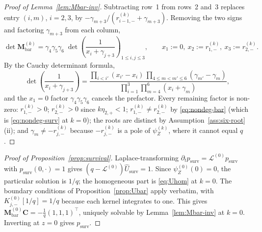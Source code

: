 \documentclass[11pt]{article}
\theoremstyle{plain}
\theoremstyle{definition}
\theoremstyle{remark}
\begin{document}
\begin{proof}[Proof of Lemma~\ref{lem:Mbar-inv}]\label{proof:lem:Mbar-inv}
Subtracting row~1 from rows~2 and~3 replaces entry $(i,m)$, $i=2,3$, by
$-\gamma_{m+3}/(r_{i-1,-}^{(k)}+\gamma_{m+3})$. Removing the two signs and factoring
$\gamma_{m+3}$ from each column,
\[
\det\mathbf{M}_{\mathrm{bar}}^{(k)}
=
\gamma_4\gamma_5\gamma_6\;
\det\!\left(\frac{1}{x_i+\gamma_{j+3}}\right)_{\!1\le i,j\le 3},
\qquad x_1:=0,\ x_2:=r_{1,-}^{(k)},\ x_3:=r_{2,-}^{(k)}.
\]
By the Cauchy determinant formula,
\[
\det\!\left(\frac{1}{x_i+\gamma_{j+3}}\right)
=
\frac{\prod_{i<i'}(x_{i'}-x_i)\,\prod_{4\le m<m'\le 6}(\gamma_{m'}-\gamma_m)}
     {\prod_{i=1}^3\prod_{m=4}^6(x_i+\gamma_m)},
\]
and the $x_1=0$ factor $\gamma_4\gamma_5\gamma_6$ cancels the prefactor. Every remaining factor is
non-zero: $r_{1,-}^{(k)}>0$; $r_{2,-}^{(k)}>0$ since $k\eta_{2,+}<1$; $r_{1,-}^{(k)}\neq
r_{2,-}^{(k)}$ by \eqref{eq:nondeg-bar} (which is \eqref{eq:nondeg-surv} at $k=0$); the roots are
distinct by Assumption~\ref{ass:six-root}(ii); and $\gamma_m\neq-r_{j,-}^{(k)}$ because
$-r_{j,-}^{(k)}$ is a pole of $\psi_Z^{(k)}$, where it cannot equal $q$.
\end{proof}

\begin{proof}[Proof of Proposition~\ref{prop:survival}]\label{proof:prop:survival}
Laplace-transforming $\partial_tp_{\mathrm{surv}}=\mathcal L^{(0)}p_{\mathrm{surv}}$ with
$p_{\mathrm{surv}}(0,\cdot)=1$ gives $(q-\mathcal L^{(0)})\widehat U_{\mathrm{surv}}=1$. Since
$\psi_Z^{(0)}(0)=0$, the particular solution is $1/q$; the homogeneous part is \eqref{eq:Uhom} at
$k=0$. The boundary conditions of Proposition~\ref{prop:Ubar} apply verbatim, with
$K_{j,-}^{(0)}[1/q]=1/q$ because each kernel integrates to one. This gives
$\mathbf{M}_{\mathrm{bar}}^{(0)}\mathbf C=-\tfrac1q(1,1,1)^\top$, uniquely solvable by
Lemma~\ref{lem:Mbar-inv} at $k=0$. Inverting at $z=0$ gives $p_{\mathrm{surv}}$.
\end{proof}
\end{document}
